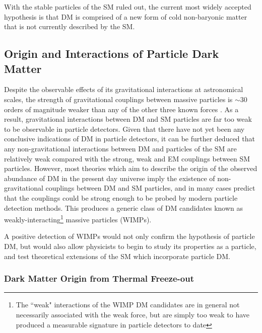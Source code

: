 With the stable particles of the SM ruled out, the current most widely accepted hypothesis is that DM is comprised of a new form of cold non-baryonic matter that is not currently described by the SM.

\subsection{Origin and Interactions of Particle Dark Matter}
\label{sec:dm_origins}

Despite the observable effects of its gravitational interactions at astronomical scales, the strength of gravitational couplings between massive particles is \(\sim30\) orders of magnitude weaker than any of the other three known forces \cite{griffiths_2008}. As a result, gravitational interactions between DM and SM particles are far too weak to be observable in particle detectors. Given that there have not yet been any conclusive indications of DM in particle detectors, it can be further deduced that any non-gravitational interactions between DM and particles of the SM are relatively weak compared with the strong, weak and EM couplings between SM particles. However, most theories which aim to describe the origin of the observed abundance of DM in the present day universe imply the existence of non-gravitational couplings between DM and SM particles, and in many cases predict that the couplings could be strong enough to be probed by modern particle detection methods. This produces a generic class of DM candidates known as weakly-interacting\footnote{The ``weak" interactions of the WIMP DM candidates are in general not necessarily associated with the weak force, but are simply too weak to have produced a measurable signature in particle detectors to date} massive particles (WIMPs). 

A positive detection of WIMPs would not only confirm the hypothesis of particle DM, but would also allow physicists to begin to study its properties as a particle, and test theoretical extensions of the SM which incorporate particle DM.

\subsubsection{Dark Matter Origin from Thermal Freeze-out}

